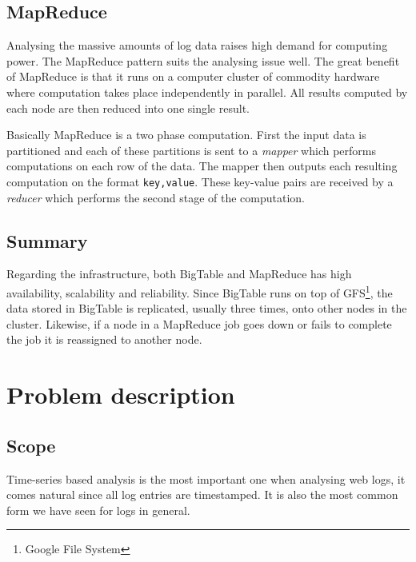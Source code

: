 \documentclass[a4paper,10pt]{book}
\begin{document}
\section{MapReduce}

Analysing the massive amounts of log data raises high demand for computing
power. The MapReduce \cite{mapreduce} pattern suits the analysing issue
well. The great benefit of MapReduce is that it runs on a computer cluster
of commodity hardware where computation takes place independently in
parallel. All results computed by each node are then reduced into one
single result.

Basically MapReduce is a two phase computation. First the input data is
partitioned and each of these partitions is sent to a \textit{mapper} which
performs computations on each row of the data. The mapper then outputs each
resulting computation on the format \texttt{key,value}. These key-value
pairs are received by a \textit{reducer} which performs the second stage of
the computation.



\section{Summary}

Regarding the infrastructure, both BigTable and MapReduce has high
availability, scalability and reliability. Since BigTable runs on top of
GFS\footnote{Google File System}, the data stored in BigTable is
replicated, usually three times, onto other nodes in the cluster.
\cite{gfs} Likewise, if a node in a MapReduce job goes down or fails to
complete the job it is reassigned to another node. \cite{mapreduce}



\chapter{Problem description}

\section{Scope}

Time-series based analysis is the most important one when analysing web
logs, it comes natural since all log entries are timestamped.
\cite{discoveringweb} It is also the most common form we have seen for logs
in general.
\end{document}
